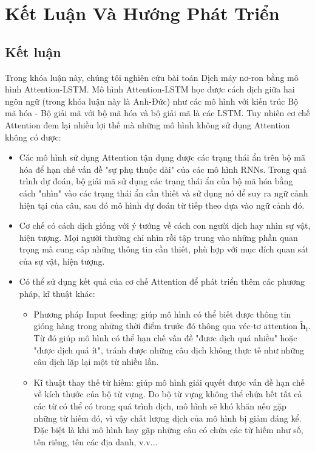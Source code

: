 \chapter{Kết Luận Và Hướng Phát Triển}
\ifpdf
    \graphicspath{{Chapter5/Chapter5Figs/PNG/}{Chapter5/Chapter5Figs/PDF/}{Chapter5/Chapter5Figs/}}
\else
    \graphicspath{{Chapter5/Chapter5Figs/EPS/}{Chapter5/Chapter5Figs/}}
\fi
\label{chap_5}

\section{Kết luận}

Trong khóa luận này, chúng tôi nghiên cứu bài toán Dịch máy nơ-ron bằng mô hình Attention-LSTM. Mô hình Attention-LSTM học được cách dịch giữa hai ngôn ngữ (trong khóa luận này là Anh-Đức) như các mô hình với kiến trúc Bộ mã hóa - Bộ giải mã với bộ mã hóa và bộ giải mã là các LSTM. Tuy nhiên cơ chế Attention đem lại nhiều lợi thế mà những mô hình không sử dụng Attention không có được:
\begin{itemize}
	\item Các mô hình sử dụng Attention tận dụng được các trạng thái ẩn trên bộ mã hóa để hạn chế vấn đề "sự phụ thuộc dài" của các mô hình RNNs. Trong quá trình dự đoán, bộ giải mã sử dụng các trạng thái ẩn của bộ mã hóa bằng cách "nhìn" vào các trạng thái ẩn cần thiết và sử dụng nó để suy ra ngữ cảnh hiện tại của câu, sau đó mô hình dự đoán từ tiếp theo dựa vào ngữ cảnh đó.
	\item Cơ chế có cách dịch giống với ý tưởng về cách con người dịch hay nhìn sự vật, hiện tượng. Mọi người thường chỉ nhìn rồi tập trung vào những phần quan trọng mà cung cấp những thông tin cần thiết, phù hợp với mục đích quan sát của sự vật, hiện tượng.
	\item Có thể sử dụng kết quả của cơ chế Attention để phát triển thêm các phương pháp, kĩ thuật khác:
	\begin{itemize}
		\item Phương pháp Input feeding: giúp mô hình có thể biết được thông tin gióng hàng trong những thời điểm trước đó thông qua véc-tơ attention $\bm{\tilde{h}}_t$. Từ đó giúp mô hình có thể hạn chế vấn đề "đươc dịch quá nhiều" hoặc "được dịch quá ít", tránh được những câu dịch không thực tế như những câu dịch lặp lại một từ nhiều lần.
		\item Kĩ thuật thay thế từ hiếm: giúp mô hình giải quyết được vấn đề hạn chế về kích thước của bộ từ vựng. Do bộ từ vựng không thể chứa hết tất cả các từ có thể có trong quá trình dịch, mô hình sẽ khó khăn nếu gặp những từ hiếm đó, vì vậy chất lượng dịch của mô hình bị giảm đáng kể. Đặc biệt là khi mô hình hay gặp những câu có chứa các từ hiếm như số, tên riêng, tên các địa danh, v.v... 
	\end{itemize}
\end{itemize}

